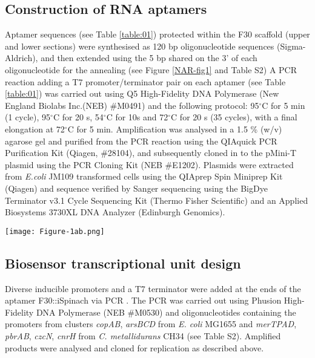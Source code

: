 \subsection*{Construction of RNA aptamers}

Aptamer sequences (see Table \ref{table:01}) protected within the F30 scaffold (upper and lower sections) were synthesised as 120 bp oligonucleotide sequences (Sigma-Aldrich), and then extended using the 5 bp shared on the 3' of each oligonucleotide for the annealing (see Figure \ref{NAR-fig1} and Table S2)
A PCR reaction adding a T7 promoter/terminator pair on each aptamer (see Table \ref{table:01}) was carried out using Q5 High-Fidelity DNA Polymerase (New England Biolabs Inc.(NEB) \#M0491) and the following protocol: 95$^{\circ}$C for 5 min (1 cycle), 95$^{\circ}$C for 20 s, 54$^{\circ}$C for 10s and 72$^{\circ}$C for 20 s (35 cycles), with a final elongation at 72$^{\circ}$C for 5 min. Amplification was analysed in a 1.5 \% (w/v) agarose gel and purified from the PCR reaction using the QIAquick PCR Purification Kit (Qiagen, \#28104), and subsequently cloned in to the pMini-T plasmid using the PCR Cloning Kit (NEB \#E1202). 
Plasmids were extracted from \textit{E.coli} JM109 transformed cells using the QIAprep Spin Miniprep Kit (Qiagen) and sequence verified by Sanger sequencing using the BigDye Terminator v3.1 Cycle Sequencing Kit (Thermo Fisher Scientific) and an Applied Biosystems 3730XL DNA Analyzer (Edinburgh Genomics).

\begin{figure*}[h]
\begin{center}
\hspace*{0cm}
\texttt{[image: Figure-1ab.png]}
\end{center}
\caption{Schematic diagrams of TXO cell free system with minimal requirements. \textbf{(a)} Sequence and production process of diverse RNA aptamers via PCR, showing addition of BsmBI sites for further Golden Gate manipulation. \textbf{(b)} In a TXO system there are minimal requirements such as an inducer, moderator/repressor, RNA polymerase and a final RNA output herewith represented as a fluorescent aptamer.}
\label{NAR-fig1}
\end{figure*}

\subsection*{Biosensor transcriptional unit design}
Diverse inducible promoters and a T7 terminator were added at the ends of the aptamer F30::iSpinach via PCR \cite{13}. The PCR was carried out using Phusion High-Fidelity DNA Polymerase (NEB \#M0530) and oligonucleotides containing the promoters from clusters \textit{copAB}, \textit{arsBCD} from \textit{E. coli} MG1655 and \textit{merTPAD}, \textit{pbrAB}, \textit{czcN}, \textit{cnrH} from \textit{C. metallidurans} CH34 (see Table S2). Amplified products were analysed and cloned for replication as described above.

